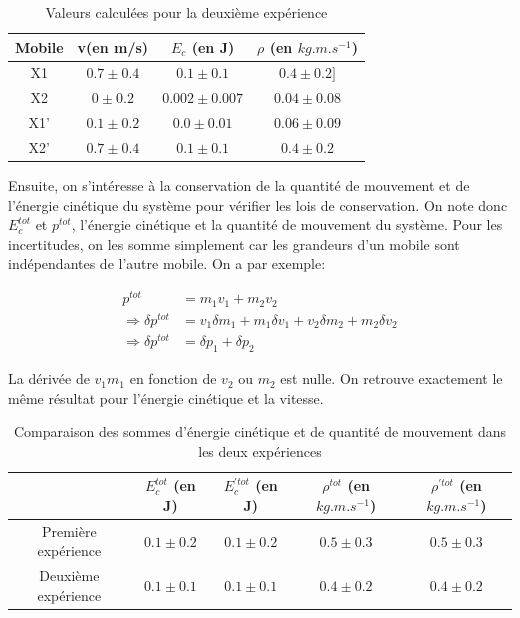 \documentclass[12pt]{article}
\begin{document}
\begin{table}[!h]
	\begin{center}
		\begin{tabular}{|c|c|c|c|}
		\hline
		Mobile & v(en m/s)  & $E_c$ (en J) & $\rho$ (en $kg.m.s^{-1}$) \\
		\hline
		X1 & $0.7\pm 0.4$ & $0.1 \pm 0.1$ & $0.4 \pm 0.2]$  \\
		\hline
		X2 & $0\pm 0.2$ & $0.002\pm 0.007$  & $0.04\pm 0.08$ \\
		\hline 
		X1' & $0.1\pm 0.2$ & $0.0\pm 0.01$  & $0.06\pm 0.09$ \\
		\hline 
		X2' & $0.7\pm 0.4$ & $0.1\pm 0.1$  & $0.4\pm 0.2$ \\
		\hline		
		\end{tabular}	
		\label{Tableau deuxième expérience}
		\caption{Valeurs calculées pour la deuxième expérience}
	\end{center}
\end{table}

\newpage

Ensuite, on s'intéresse à la conservation de la quantité de mouvement et de l'énergie cinétique du système pour
vérifier les lois de conservation. On note donc $E_c^{tot}$ et $p^{tot}$, l'énergie cinétique et la quantité de mouvement du système. 
Pour les incertitudes, on les somme simplement car les grandeurs d'un mobile sont indépendantes de l'autre mobile. On a par exemple:

\begin{align}
    p^{tot} & = m_1v_1 + m_2v_2 \\
    \Rightarrow \delta p^{tot} & = v_1\delta m_1 + m_1\delta v_1 + v_2\delta m_2 + m_2\delta v_2 \\
    \Rightarrow \delta p^{tot} & = \delta p_1 + \delta p_2
\end{align}

La dérivée de $v_1m_1$ en fonction de $v_2$ ou $m_2$ est nulle. On retrouve exactement le même résultat pour l'énergie cinétique et la vitesse.

\begin{table}[!h]
	\begin{center}
		\begin{tabular}{|c|c|c|c|c|}
		\hline
		& $E_c^{tot}$ (en J) & $E_c^{'tot}$ (en J)& $\rho^{tot}$ (en $kg.m.s^{-1}$) & $\rho^{'tot}$ (en $kg.m.s^{-1}$)\\
		\hline
		Première expérience & $0.1 \pm 0.2$ & $0.1\pm 0.2$ & $0.5\pm 0.3$ & $0.5\pm 0.3$\\
		\hline
		Deuxième expérience & $0.1\pm 0.1$ & $0.1\pm 0.1$ & $0.4\pm 0.2$ & $0.4\pm 0.2$\\
		\hline		
		\end{tabular}
		\label{TableauSomme}
		\caption{Comparaison des sommes d'énergie cinétique et de quantité de mouvement dans les deux expériences}
	\end{center}
\end{table}
\end{document}

